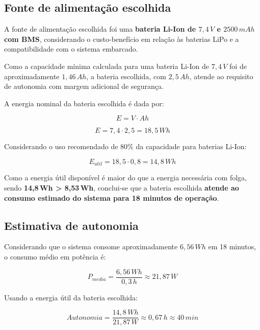 \subsection{Fonte de alimentação escolhida}

A fonte de alimentação escolhida foi uma \textbf{bateria Li-Ion de $7{,}4\,V$ e $2500\,mAh$ com BMS}, considerando o custo-benefício em relação às baterias LiPo e a compatibilidade com o sistema embarcado.

Como a capacidade mínima calculada para uma bateria Li-Ion de $7{,}4\,V$ foi de aproximadamente $1{,}46\,Ah$, a bateria escolhida, com $2{,}5\,Ah$, atende ao requisito de autonomia com margem adicional de segurança.

A energia nominal da bateria escolhida é dada por:

\begin{equation}
E = V \cdot Ah
\end{equation}

\begin{equation}
E = 7{,}4 \cdot 2{,}5 = 18{,}5\,Wh
\end{equation}


Considerando o uso recomendado de 80\% da capacidade para baterias Li-Ion:

\begin{equation}
E_{util} = 18{,}5 \cdot 0{,}8 = 14{,}8\,Wh
\end{equation}


Como a energia útil disponível é maior do que a energia necessária com folga, sendo \textbf{14{,}8\,Wh > 8{,}53\,Wh}, conclui-se que a bateria escolhida \textbf{atende ao consumo estimado do sistema para 18 minutos de operação}.


\subsection{Estimativa de autonomia}

Considerando que o sistema consome aproximadamente $6{,}56\,Wh$ em 18 minutos, o consumo médio em potência é:

\begin{equation}
P_{media} = \frac{6{,}56\,Wh}{0{,}3\,h} \approx 21{,}87\,W
\end{equation}

Usando a energia útil da bateria escolhida:

\begin{equation}
Autonomia = \frac{14{,}8\,Wh}{21{,}87\,W} \approx 0{,}67\,h \approx 40\,min
\end{equation}



